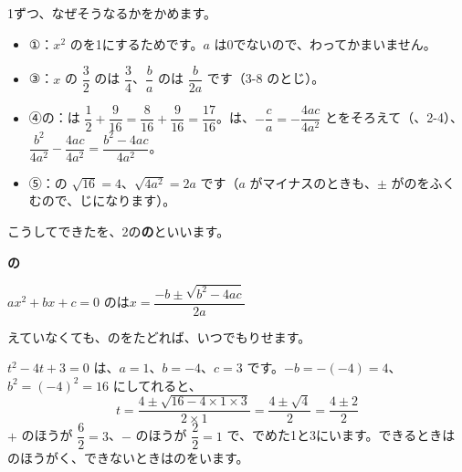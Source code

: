 1ずつ、なぜそうなるかをかめます。
\begin{itemize}[leftmargin=1.6\zw, itemsep=2pt, topsep=1pt, label={\color{\bkTT}●}]
\item ①：$x^2$ のを1にするためです。$a$ は0でないので、わってかまいません。
\item ③：$x$ の $\dfrac{3}{2}$ のは $\dfrac{3}{4}$、$\dfrac{b}{a}$ のは $\dfrac{b}{2a}$ です（3-8 のとじ）。
\item ④の：は $\dfrac{1}{2}+\dfrac{9}{16}=\dfrac{8}{16}+\dfrac{9}{16}=\dfrac{17}{16}$。は、$-\dfrac{c}{a}=-\dfrac{4ac}{4a^2}$ とをそろえて（、2-4）、$\dfrac{b^2}{4a^2}-\dfrac{4ac}{4a^2}=\dfrac{b^2-4ac}{4a^2}$。
\item ⑤：の $\sqrt{16}=4$、$\sqrt{4a^2}=2a$ です（$a$ がマイナスのときも、$\pm$ がのをふくむので、じになります）。
\end{itemize}

こうしてできたを、2の\textbf{の}といいます。
\begin{taisetsu}
\textbf{の}\par
$ax^2+bx+c=0$ のは\quad $x=\dfrac{-b\pm\sqrt{b^2-4ac}}{2a}$
\end{taisetsu}
えていなくても、のをたどれば、いつでもりせます。

$t^2-4t+3=0$ は、$a=1$、$b=-4$、$c=3$ です。$-b=-(-4)=4$、$b^2=(-4)^2=16$ にしてれると、
\[ t=\frac{4\pm\sqrt{16-4\times1\times3}}{2\times1}=\frac{4\pm\sqrt{4}}{2}=\frac{4\pm2}{2} \]
$+$ のほうが $\dfrac{6}{2}=3$、$-$ のほうが $\dfrac{2}{2}=1$ で、でめた1と3にいます。できるときはのほうがく、できないときはのをいます。


